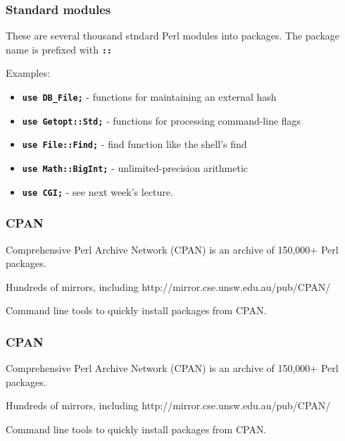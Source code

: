 \begin{frame}
\frametitle{Standard modules}
These are several thousand stndard Perl modules into packages.
The package name is prefixed with \textbf{\tt{::}}


Examples:
\begin{itemize}
\item 
\textbf{\tt{use DB\_File;}} - functions for maintaining an external hash
\item 
\textbf{\tt{use Getopt::Std;}} - functions for processing command-line flags
\item 
\textbf{\tt{use File::Find;}} - find function like the shell's find
\item 
\textbf{\tt{use Math::BigInt;}} - unlimited-precision arithmetic
\item 
\textbf{\tt{use CGI;}} - see next week's lecture.
\end{itemize}

\end{frame}


\begin{frame}
\frametitle{CPAN}

Comprehensive Perl Archive Network (CPAN) is an archive of 150,000+ Perl packages.

Hundreds of mirrors, including http://mirror.cse.unsw.edu.au/pub/CPAN/

Command line tools to quickly install packages from CPAN.

\end{frame}


\begin{frame}
\frametitle{CPAN}

Comprehensive Perl Archive Network (CPAN) is an archive of 150,000+ Perl packages.

Hundreds of mirrors, including http://mirror.cse.unsw.edu.au/pub/CPAN/

Command line tools to quickly install packages from CPAN.

\end{frame}


